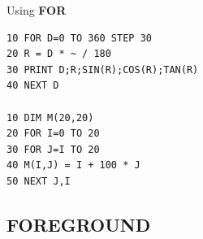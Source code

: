 \begin{description}[leftmargin=2cm,style=nextline]
\item [Example:] Using {\bf FOR}
\begin{tcolorbox}[colback=black,coltext=white]
\verbatimfont{\codefont}
\begin{verbatim}
10 FOR D=0 TO 360 STEP 30
20 R = D * ~ / 180
30 PRINT D;R;SIN(R);COS(R);TAN(R)
40 NEXT D

10 DIM M(20,20)
20 FOR I=0 TO 20
30 FOR J=I TO 20
40 M(I,J) = I + 100 * J
50 NEXT J,I
\end{verbatim}
\end{tcolorbox}
\end{description}


\newpage
\subsection{FOREGROUND}
